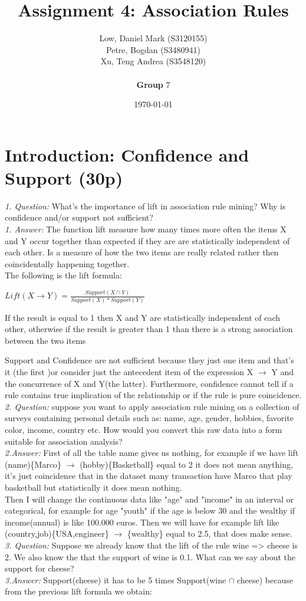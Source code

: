 \documentclass[a4paper]{article}
\title{Assignment 4: Association Rules}
\author{
Low, Daniel Mark (S3120155) \\
Petre, Bogdan (S3480941) \\
Xu, Teng Andrea (S3548120) \\ 
 \\ \textbf{Group} 7}
\date{\today}
\begin{document}
\maketitle

\section{Introduction: Confidence and Support (30p)}

\textit{1. Question:} What’s the importance of lift in association rule mining? Why is confidence and/or
support not sufficient?\\
\textit{1. Answer:} The function lift measure how many times more often the items X and Y occur together than expected if they are are statistically independent of each other. Is a measure of how the two items are really related rather then coincidentally happening together.\\
The following is the lift formula:

\begin{center}
	$Lift(X\rightarrow Y)=  \frac{Support(X \cap  Y)}{Support(X)*Support(Y)}$ 
\end{center}
If the result is equal to 1 then X and Y are statistically independent of each other, otherwise if the result is greater than 1 than there is a strong association between the two items

Support and Confidence are not sufficient because they just one item and that's it (the first )or consider just the antecedent item of the expression X $\rightarrow$ Y and the concurrence of X and Y(the latter). Furthermore, confidence cannot tell if a rule contains true implication of the relationship or if the rule is pure coincidence.\\
\newline
\textit{2. Question:} suppose you want to apply association rule mining on a collection of surveys containing
personal details such as: name, age, gender, hobbies, favorite color, income, country etc.
How would you convert this raw data into a form suitable for association analysis? \\
\textit{2.Answer:} First of all the table name gives us nothing, for example if we have lift (name)\{Marco\} $\rightarrow$ (hobby)\{Basketball\} equal to 2 it does not mean anything, it's just coincidence that in the dataset many transaction have Marco that play basketball but statistically it does mean nothing.\\
Then I will change the continuous data like "age" and "income" in an interval or categorical, for example for age "youth" if the age is below 30 and the wealthy if income(annual) is like 100.000 euros. Then we will have for example lift like (country,job)\{USA,engineer\} $\rightarrow$ \{wealthy\} equal to 2.5, that does make sense.\\  
\newline
\textit{3. Question:} Suppose we already know that the lift of the rule wine => cheese is 2. We also know the
that the support of wine is 0.1. What can we say about the support for cheese?\\
\textit{3.Answer:} Support(cheese) it has to be 5 times Support(wine $\cap$ cheese) because from the previous lift formula we obtain:
\end{document}
